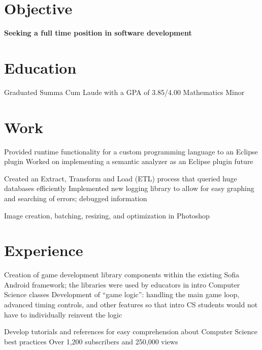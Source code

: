 \documentclass{my_cv}
\begin{document}

\section{Objective}
\workitemsone
{\textbf{Seeking a full time position in software development}}

\section{Education}
\workitemstwo
{Graduated Summa Cum Laude with a GPA of 3.85/4.00 }
{Mathematics Minor}
 
\section{Work}
\workitemstwo
{Provided runtime functionality for a custom programming language to an Eclipse plugin}
{Worked on implementing a semantic analyzer as an Eclipse plugin future}

\workitemstwo
{Created an Extract, Transform and Load (ETL) process that queried huge databases efficiently  }
{Implemented new logging library to allow for easy graphing and searching of errors; debugged information}

\workitemsone
{Image creation, batching, resizing, and optimization in Photoshop}

\section{Experience}
\workitemstwo
{Creation of game development library components within the existing Sofia Android framework; the libraries were used by educators in intro Computer Science classes }
{Development of “game logic”: handling the main game loop, advanced timing controls, and other features so that intro CS students would not have to individually reinvent the logic}

\workitemstwo
{Develop tutorials and references for easy comprehension about Computer Science best practices }
{Over 1,200 subscribers and 250,000 views}
\end{document}
